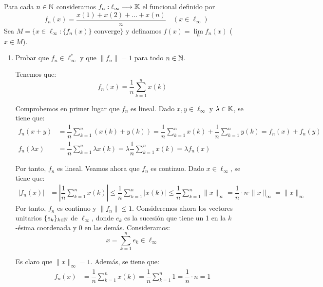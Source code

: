 \begin{ejercicio}
Para cada $n \in \mathbb{N}$ consideramos $f_n: \ell_\infty \longrightarrow \mathbb{K}$ el funcional definido por
\[
f_n(x) = \frac{x(1) + x(2) + \dots + x(n)}{n} \quad (x \in \ell_\infty)
\]
Sea $M = \{x \in \ell_\infty : \{f_n(x)\} \text{ converge}\}$ y definamos $f(x) = \lim\limits_n f_n(x)$ ($x \in M$).
\begin{enumerate}
    \item Probar que $f_n \in \ell_\infty^*$ y que $\|f_n\| = 1$ para todo $n \in \mathbb{N}$.
    
    Tenemos que:
    \begin{equation*}
        f_n(x) = \dfrac{1}{n} \sum_{k = 1}^n x(k)
    \end{equation*}

    Comprobemos en primer lugar que $f_n$ es lineal. Dado $x, y \in \ell_\infty$ y $\lambda \in \mathbb{K}$, se tiene que:
    \begin{align*}
        f_n(x + y) &= \dfrac{1}{n} \sum_{k = 1}^n (x(k) + y(k)) = \dfrac{1}{n} \sum_{k = 1}^n x(k) + \dfrac{1}{n} \sum_{k = 1}^n y(k) = f_n(x) + f_n(y) \\
        f_n(\lambda x) &= \dfrac{1}{n} \sum_{k = 1}^n \lambda x(k) = \lambda \dfrac{1}{n} \sum_{k = 1}^n x(k) = \lambda f_n(x)
    \end{align*}

    Por tanto, $f_n$ es lineal. Veamos ahora que $f_n$ es continuo. Dado $x \in \ell_\infty$, se tiene que:
    \begin{align*}
        |f_n(x)| &= \left|\dfrac{1}{n} \sum_{k = 1}^n x(k)\right| \leq \dfrac{1}{n} \sum_{k = 1}^n |x(k)| \leq \dfrac{1}{n} \sum_{k = 1}^n \|x\|_\infty = \dfrac{1}{n} \cdot n \cdot \|x\|_\infty = \|x\|_\infty
    \end{align*}
    Por tanto, $f_n$ es continuo y $\|f_n\|\leq 1$. Consideremos ahora los vectores unitarios $\{e_k\}_{k \in \mathbb{N}}$ de $\ell_\infty$, donde $e_k$ es la sucesión que tiene un 1 en la $k$-ésima coordenada y 0 en las demás. Consideramos:
    \begin{equation*}
        x = \sum_{k = 1}^n e_k\in \ell_\infty
    \end{equation*}

    Es claro que $\|x\|_\infty = 1$. Además, se tiene que:
    \begin{align*}
        f_n(x) &= \dfrac{1}{n} \sum_{k = 1}^n x(k) = \dfrac{1}{n} \sum_{k = 1}^n 1 = \dfrac{1}{n} \cdot n = 1
    \end{align*}


\end{enumerate}
\end{ejercicio}
